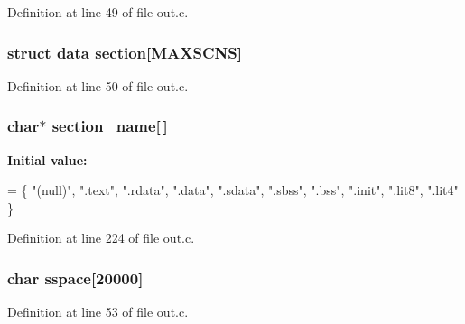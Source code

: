 Definition at line 49 of file out.\+c.

\subsubsection[{section}]{\setlength{\rightskip}{0pt plus 5cm}struct {\bf data} section[{\bf M\+A\+X\+S\+C\+NS}]}\label{out_8c_ab91b75e9b6dbaa62440ee2eafac9fccd}


Definition at line 50 of file out.\+c.

\subsubsection[{section\+\_\+name}]{\setlength{\rightskip}{0pt plus 5cm}char$\ast$ section\+\_\+name[$\,$]}\label{out_8c_ad5da7e486ce50ec0a857d2e17794de15}
{\bfseries Initial value\+:}
\begin{DoxyCode}
= \{
  \textcolor{stringliteral}{"(null)"}, \textcolor{stringliteral}{".text"}, \textcolor{stringliteral}{".rdata"}, \textcolor{stringliteral}{".data"}, \textcolor{stringliteral}{".sdata"}, \textcolor{stringliteral}{".sbss"}, \textcolor{stringliteral}{".bss"},
  \textcolor{stringliteral}{".init"}, \textcolor{stringliteral}{".lit8"}, \textcolor{stringliteral}{".lit4"}
\}
\end{DoxyCode}


Definition at line 224 of file out.\+c.

\subsubsection[{sspace}]{\setlength{\rightskip}{0pt plus 5cm}char sspace[20000]}\label{out_8c_abfdfdd25fce66a953708f5e983be050c}


Definition at line 53 of file out.\+c.

